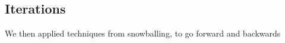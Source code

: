 



 


\subsection{Iterations}

We then applied techniques from snowballing, to go forward and backwards 


